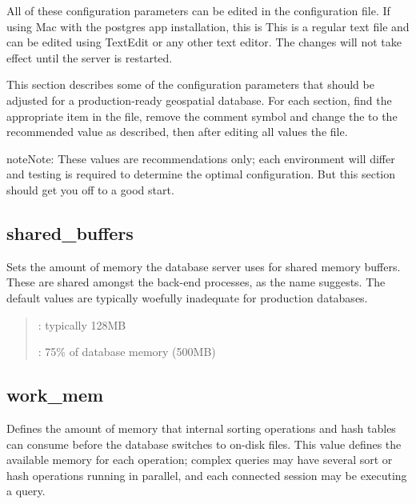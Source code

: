 \documentclass[a4paper,11pt,english]{sphinxmanual}
\begin{document}
All of these configuration parameters can be edited in the  configuration file. If using Mac with the postgres app installation, this is  This is a regular text file and can be edited using TextEdit or any other text editor.  The changes will not take effect until the server is restarted.

\noindent{}

This section describes some of the configuration parameters that should be adjusted for a production-ready geospatial database.  For each section, find the appropriate item in the file, remove the comment symbol \sphinxstylestrong{\#} and change the  to the recommended value as described, then after editing all values  the file.

\begin{sphinxadmonition}{note}{Note:}
These values are recommendations only; each environment will differ and testing is required to determine the optimal configuration.  But this section should get you off to a good start.
\end{sphinxadmonition}


\subsection{shared\_buffers}
\label{\detokenize{maintenance:shared-buffers}}
Sets the amount of memory the database server uses for shared memory buffers.  These are shared amongst the back-end processes, as the name suggests.  The default values are typically woefully inadequate for production databases.
\begin{quote}

: typically 128MB

: 75\% of database memory (500MB)
\end{quote}

\noindent{}


\subsection{work\_mem}
\label{\detokenize{maintenance:work-mem}}
Defines the amount of memory that internal sorting operations and hash tables can consume before the database switches to on-disk files.  This value defines the available memory for each operation; complex queries may have several sort or hash operations running in parallel, and each connected session may be executing a query.
\end{document}
